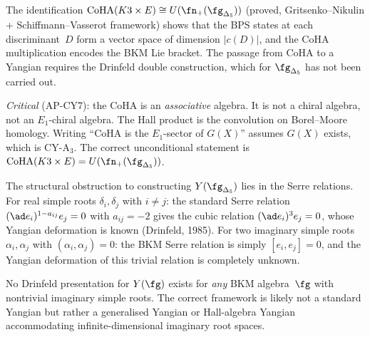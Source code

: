 \begin{remark}
\label{rem:bkm-yangian-coha}
The identification $\mathrm{CoHA}(K3 \times E) \cong U(\fn_+(\fg_{\Delta_5}))$ (proved, Gritsenko--Nikulin + Schiffmann--Vasserot framework) shows that the BPS states at each discriminant~$D$ form a vector space of dimension $|c(D)|$, and the CoHA multiplication encodes the BKM Lie bracket.  The passage from CoHA to a Yangian requires the Drinfeld double construction, which for $\fg_{\Delta_5}$ has not been carried out.

\emph{Critical} (AP-CY7): the CoHA is an \emph{associative} algebra.  It is not a chiral algebra, not an $E_1$-chiral algebra.  The Hall product is the convolution on Borel--Moore homology.  Writing ``$\mathrm{CoHA}$ is the $E_1$-sector of $G(X)$'' assumes $G(X)$ exists, which is CY-A$_3$.  The correct unconditional statement is $\mathrm{CoHA}(K3 \times E) = U(\fn_+(\fg_{\Delta_5}))$.
\end{remark}

\begin{remark}
\label{rem:borcherds-serre-obstruction}
The structural obstruction to constructing $Y(\fg_{\Delta_5})$ lies in the Serre relations.  For real simple roots $\delta_i, \delta_j$ with $i \neq j$: the standard Serre relation $(\ad e_i)^{1 - a_{ij}} e_j = 0$ with $a_{ij} = -2$ gives the cubic relation $(\ad e_i)^3 e_j = 0$, whose Yangian deformation is known (Drinfeld, 1985).  For two imaginary simple roots $\alpha_i, \alpha_j$ with $(\alpha_i, \alpha_j) = 0$: the BKM Serre relation is simply $[e_i, e_j] = 0$, and the Yangian deformation of this trivial relation is completely unknown.

No Drinfeld presentation for $Y(\fg)$ exists for \emph{any} BKM algebra~$\fg$ with nontrivial imaginary simple roots.  The correct framework is likely not a standard Yangian but rather a generalised Yangian or Hall-algebra Yangian accommodating infinite-dimensional imaginary root spaces.
\end{remark}

